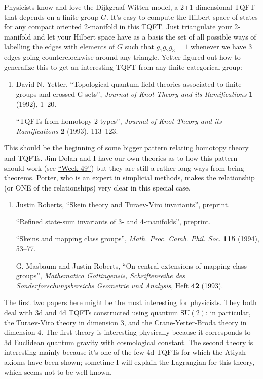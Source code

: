 \documentclass{article}
\begin{document}
Physicists know and love the Dijkgraaf-Witten model, a 2+1-dimensional
TQFT that depends on a finite group \(G\). It's easy to compute the
Hilbert space of states for any compact oriented 2-manifold in this
TQFT. Just triangulate your 2-manifold and let your Hilbert space have
as a basis the set of all possible ways of labelling the edges with
elements of \(G\) such that \(g_1g_2g_3 = 1\) whenever we have 3 edges
going counterclockwise around any triangle. Yetter figured out how to
generalize this to get an interesting TQFT from any finite categorical
group:

\begin{enumerate}
\def\labelenumi{\arabic{enumi})}
\setcounter{enumi}{3}
\item
  David N. Yetter, ``Topological quantum field theories associated to
  finite groups and crossed G-sets'', \emph{Journal of Knot Theory and
  its Ramifications} \textbf{1} (1992), 1--20.

  ``TQFTs from homotopy 2-types'', \emph{Journal of Knot Theory and its
  Ramifications} \textbf{2} (1993), 113--123.
\end{enumerate}

This should be the beginning of some bigger pattern relating homotopy
theory and TQFTs. Jim Dolan and I have our own theories as to how this
pattern should work (see \protect\hyperlink{week49}{``Week 49''}) but
they are still a rather long ways from being theorems. Porter, who is an
expert in simplicial methods, makes the relationship (or ONE of the
relationships) very clear in this special case.

\begin{enumerate}
\def\labelenumi{\arabic{enumi})}
\setcounter{enumi}{4}
\item
  Justin Roberts, ``Skein theory and Turaev-Viro invariants'', preprint.

  ``Refined state-sum invariants of 3- and 4-manifolds'', preprint.

  ``Skeins and mapping class groups'', \emph{Math. Proc. Camb. Phil.
  Soc.} \textbf{115} (1994), 53--77.

  G. Masbaum and Justin Roberts, ``On central extensions of mapping
  class groups'', \emph{Mathematica Gottingensis, Schriftenreihe des
  Sonderforschungsbereichs Geometrie und Analysis}, Heft \textbf{42}
  (1993).
\end{enumerate}

The first two papers here might be the most interesting for physicists.
They both deal with 3d and 4d TQFTs constructed using quantum
\(\mathrm{SU}(2)\): in particular, the Turaev-Viro theory in dimension
3, and the Crane-Yetter-Broda theory in dimension 4. The first theory is
interesting physically because it corresponds to 3d Euclidean quantum
gravity with cosmological constant. The second theory is interesting
mainly because it's one of the few 4d TQFTs for which the Atiyah axioms
have been shown; sometime I will explain the Lagrangian for this theory,
which seems not to be well-known.
\end{document}
